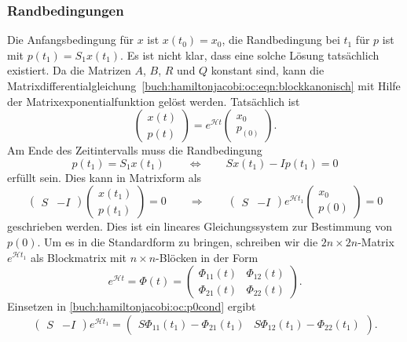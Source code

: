 \subsubsection{Randbedingungen}
Die Anfangsbedingung für $x$ ist $x(t_0)=x_0$, die Randbedingung bei
$t_1$ für $p$ ist mit $p(t_1)=S_1x(t_1)$.
Es ist nicht klar, dass eine solche Lösung tatsächlich existiert.
Da die Matrizen $A$, $B$, $R$ und $Q$ konstant sind, kann die
Matrixdifferentialgleichung~\eqref{buch:hamiltonjacobi:oc:eqn:blockkanonisch}
mit Hilfe der Matrixexponentialfunktion gelöst werden.
Tatsächlich ist
\begin{equation}
\begin{pmatrix}
x(t)\\
p(t)
\end{pmatrix}
=
e^{\mathscr{H}t}
\begin{pmatrix}
x_0\\
p_(0)
\end{pmatrix}.
\label{buch:hamiltonjacobi:oc:eqn:kansol}
\end{equation}
Am Ende des Zeitintervalls muss die Randbedingung
\[
p(t_1) = S_1x(t_1)
\qquad\Leftrightarrow\qquad
Sx(t_1)
-
Ip(t_1)
=
0
\]
erfüllt sein.
Dies kann in Matrixform als
\begin{equation}
\begin{pmatrix}
S & -I
\end{pmatrix}
\begin{pmatrix}
x(t_1)\\
p(t_1)
\end{pmatrix}
=
0
\qquad\Rightarrow\qquad
\begin{pmatrix}
S & -I
\end{pmatrix}
e^{\mathscr{H}t_1}
\begin{pmatrix}
x_0\\
p(0)
\end{pmatrix}
=
0
\label{buch:hamiltonjacobi:oc:p0cond}
\end{equation}
geschrieben werden.
Dies ist ein lineares Gleichungssystem zur Bestimmung von $p(0)$.
Um es in die Standardform zu bringen, schreiben wir die $2n\times 2n$-Matrix
$e^{\mathscr{H}t_1}$ als Blockmatrix mit $n\times n$-Blöcken in der Form
\[
e^{\mathscr{H}t}
=
\Phi(t)
=
\begin{pmatrix}
\Phi_{11}(t) &
\Phi_{12}(t) \\
\Phi_{21}(t) &
\Phi_{22}(t) 
\end{pmatrix}.
\]
Einsetzen in \eqref{buch:hamiltonjacobi:oc:p0cond} ergibt
\[
\begin{pmatrix}
S & -I
\end{pmatrix}
e^{\mathscr{H}t_1}
=
\begin{pmatrix}
S\Phi_{11}(t_1)
-\Phi_{21}(t_1)
&
S\Phi_{12}(t_1)
-\Phi_{22}(t_1)
\end{pmatrix}.
\]
